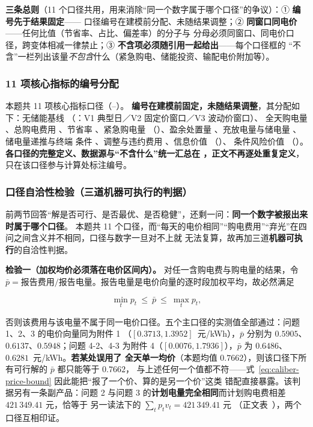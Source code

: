 \textbf{三条总则}（11 个口径共用，用来消除“同一个数字属于哪个口径”的争议）：① \textbf{编号先于结果固定}——
口径编号在建模前分配、未随结果调整；② \textbf{同窗口同电价}——任何比值（节省率、占比、偏差率）的分子与
分母必须同窗口、同电价口径，跨变体相减一律禁止；③ \textbf{不含项必须随引用一起给出}——每个口径框的
“不含”一栏列出该量\emph{不包含}什么（紧急购电、储能投资、输配电价附加等）。



\subsubsection{11 项核心指标的编号分配}\label{sec:caliber-alloc}

本题共 11 项核心指标口径（--）。
\textbf{编号在建模前固定，未随结果调整}，其分配如下：无储能基线 （：V1 典型日／V2 固定价窗口／V3 波动价窗口）、
全天购电量 、总购电费用 、节省率 、紧急购电量 
（）、盈余处置量 、充放电量与储电量 、储电量递推与终端
条件 、调整与违约费用 、信息价值 （）、
条件风险价值 （）。\textbf{各口径的完整定义、数据源与“不含什么”统一汇总在
，正文不再逐处重复定义}，只在该口径参与计算处标注编号。

\subsubsection{口径自洽性检验（三道机器可执行的判据）}\label{sec:caliber-check-app}
前两节回答“解是否可行、是否最优、是否稳健”，还剩一问：\textbf{同一个数字被报出来时属于哪个口径}。
本题共 11 个口径，而“每天的电价相同”“购电费用”“弃光”在四问之间含义并不相同，口径与数字一旦对不上就
无法复算，故再加三道\textbf{机器可执行}的自洽性判据。

\textbf{检验一（加权均价必须落在电价区间内）。} 对任一含购电费与购电量的结果，令
\(\bar p=\text{报告费用}/\text{报告电量}\)。报告电量是电价向量的逐时段加权平均，故必然满足

\begin{equation}
  \min_t p_t\ \le\ \bar p\ \le\ \max_t p_t ,
  \label{eq:caliber-price-bound}
\end{equation}

否则该费用与该电量不属于同一电价口径。五个主口径的实测值全部通过：问题 1、2、3 的电价向量同为附件 1
（\([0.3713,1.3952]\)~元/kWh），\(\bar p\) 分别为 \(0.5905\)、\(0.6137\)、\(0.5948\)；问题 4-2、4-3
为附件 4（\([0.0076,1.7936]\)），\(\bar p\) 为 \(0.6486\)、\(0.6281\)~元/kWh。\textbf{若某处误用了
全天单一均价}（本题均值 \(0.7662\)），则该口径下所有可行解的 \(\bar p\) 都只能等于 \(0.7662\)，
与上述任何一个值都不符——式~\eqref{eq:caliber-price-bound} 因此能把“报了一个价、算的是另一个价”这类
错配直接暴露。该判据另有一条副产品：问题 2 与问题 3 的\textbf{计划电量完全相同}而计划购电费相差
\(421\,349.41\) 元，恰等于  另一读法下的 \(\sum_tp_tv_t=421\,349.41\) 元
（正文表~），两个口径互相印证。

